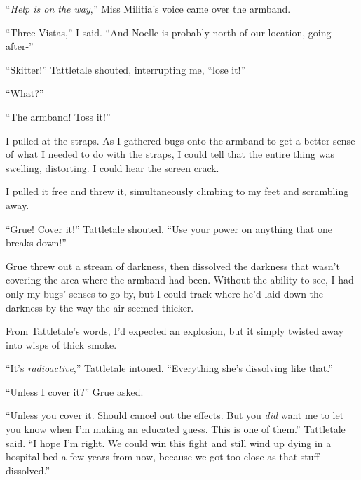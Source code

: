 





``\emph{Help is on the way},'' Miss Militia's voice came over the armband.



``Three Vistas,'' I said.  ``And Noelle is probably north of our location, going after-''



``Skitter!''  Tattletale shouted, interrupting me, ``lose it!''



``What?''



``The armband!  Toss it!''



I pulled at the straps.  As I gathered bugs onto the armband to get a better sense of what I needed to do with the straps, I could tell that the entire thing was swelling, distorting.  I could hear the screen crack.



I pulled it free and threw it, simultaneously climbing to my feet and scrambling away.



``Grue!  Cover it!''  Tattletale shouted.  ``Use your power on anything that one breaks down!''



Grue threw out a stream of darkness, then dissolved the darkness that wasn't covering the area where the armband had been.  Without the ability to see, I had only my bugs' senses to go by, but I could track where he'd laid down the darkness by the way the air seemed thicker.



From Tattletale's words, I'd expected an explosion, but it simply twisted away into wisps of thick smoke.



``It's \emph{radioactive},'' Tattletale intoned.  ``Everything she's dissolving like that.''



``Unless I cover it?'' Grue asked.



``Unless you cover it.  Should cancel out the effects.  But you \emph{did} want me to let you know when I'm making an educated guess.  This is one of them.'' Tattletale said.  ``I hope I'm right.  We could win this fight and still wind up dying in a hospital bed a few years from now, because we got too close as that stuff dissolved.''



